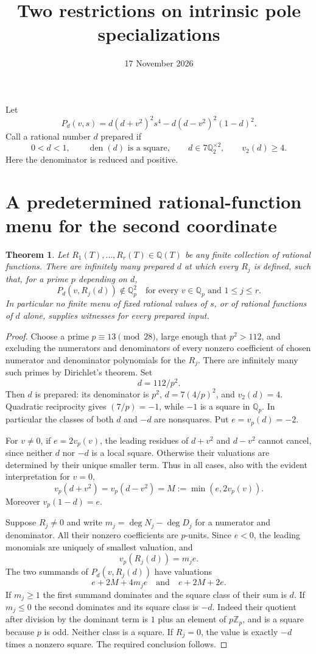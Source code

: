 \documentclass[11pt]{article}
\newtheorem{theorem}{Theorem}
\newcommand{\Q}{\mathbb Q}
\begin{document}
\title{Two restrictions on intrinsic pole specializations}
\author{}\date{17 November 2026}\maketitle
Let
\[
 P_d(v,s)=d(d+v^2)^2s^4-d(d-v^2)^2(1-d)^2.
\]
Call a rational number $d$ prepared if
\[
 0<d<1,\qquad \operatorname{den}(d)\text{ is a square},\qquad
 d\in 7\Q_2^{\times2},\qquad v_2(d)\ge4.
\]
Here the denominator is reduced and positive.

\section{A predetermined rational-function menu for the second coordinate}

\begin{theorem}\label{thm:menu}
Let $R_1(T),\ldots,R_r(T)\in\Q(T)$ be any finite collection of rational functions. There are infinitely many prepared $d$ at which every $R_j$ is defined, such that, for a prime $p$ depending on $d$,
\[
 P_d(v,R_j(d))\notin\Q_p^2
 \quad\text{for every }v\in\Q_p\text{ and }1\le j\le r.
\]
In particular no finite menu of fixed rational values of $s$, or of rational functions of $d$ alone, supplies witnesses for every prepared input.
\end{theorem}

\begin{proof}
Choose a prime $p\equiv13\pmod{28}$, large enough that $p^2>112$, and excluding the numerators and denominators of every nonzero coefficient of chosen numerator and denominator polynomials for the $R_j$. There are infinitely many such primes by Dirichlet's theorem. Set
\[
 d=112/p^2.
\]
Then $d$ is prepared: its denominator is $p^2$, $d=7(4/p)^2$, and $v_2(d)=4$. Quadratic reciprocity gives $(7/p)=-1$, while $-1$ is a square in $\Q_p$. In particular the classes of both $d$ and $-d$ are nonsquares. Put $e=v_p(d)=-2$.

For $v\ne0$, if $e=2v_p(v)$, the leading residues of $d+v^2$ and $d-v^2$ cannot cancel, since neither $d$ nor $-d$ is a local square. Otherwise their valuations are determined by their unique smaller term. Thus in all cases, also with the evident interpretation for $v=0$,
\[
 v_p(d+v^2)=v_p(d-v^2)=M:=\min(e,2v_p(v)).
\]
Moreover $v_p(1-d)=e$.

Suppose $R_j\ne0$ and write $m_j=\deg N_j-\deg D_j$ for a numerator and denominator. All their nonzero coefficients are $p$-units. Since $e<0$, the leading monomials are uniquely of smallest valuation, and
\[
 v_p(R_j(d))=m_je.
\]
The two summands of $P_d(v,R_j(d))$ have valuations
\[
 e+2M+4m_je\quad\text{and}\quad e+2M+2e.
\]
If $m_j\ge1$ the first summand dominates and the square class of their sum is $d$. If $m_j\le0$ the second dominates and its square class is $-d$. Indeed their quotient after division by the dominant term is $1$ plus an element of $p\mathbb Z_p$, and is a square because $p$ is odd. Neither class is a square. If $R_j=0$, the value is exactly $-d$ times a nonzero square. The required conclusion follows.
\end{proof}
\end{document}
